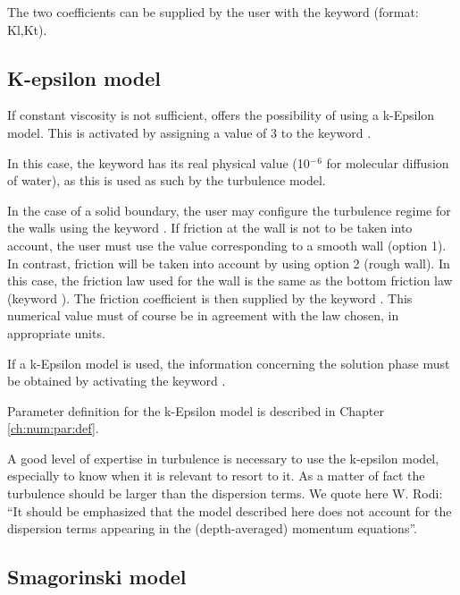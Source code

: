  The two coefficients can be supplied by the user with the keyword  (format: Kl,Kt).


\subsection{ K-epsilon model}

 If constant viscosity is not sufficient,  offers the possibility of using a k-Epsilon model. This is activated by assigning a value of 3 to the keyword .

 In this case, the keyword  has its real physical value (10${}^{-}$${}^{6}$ for molecular diffusion of water), as this is used as such by the turbulence model.

 In the case of a solid boundary, the user may configure the turbulence regime for the walls using the keyword . If friction at the wall is not to be taken into account, the user must use the value corresponding to a smooth wall (option 1). In contrast, friction will be taken into account by using option 2 (rough wall). In this case, the friction law used for the wall is the same as the bottom friction law (keyword ). The friction coefficient is then supplied by the keyword . This numerical value must of course be in agreement with the law chosen, in appropriate units.

 If a k-Epsilon model is used, the information concerning the solution phase must be obtained by activating the keyword .

 Parameter definition for the k-Epsilon model is described in Chapter \ref{ch:num:par:def}.

 A good level of expertise in turbulence is necessary to use the k-epsilon model, especially to know when it is relevant to resort to it. As a matter of fact the turbulence should be larger than the dispersion terms. We quote here W. Rodi: ``It should be emphasized that the model described here does not account for the dispersion terms appearing in the (depth-averaged) momentum equations''.


\subsection{ Smagorinski model}

